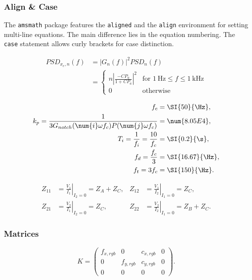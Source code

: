 \subsubsection{Align \& Case}

The \verb|amsmath| package features the \verb|aligned| and the \verb|align| environment for setting multi-line equations. The main difference
lies in the equation numbering. The \verb|case| statement allows curly brackets for case distinction.

\begin{equation}
	\begin{aligned}
		PSD_{x_{e}, n}(f) &= |G_n(f)|^2 PSD_{n}(f) \\
		&= \begin{cases}
			n|\frac{-CP_a}{1+CP_a}|^2 &\text{for } \SI{1}{\Hz} \leq f \leq \SI{1}{\kHz} \\
			0 & \text{otherwise } 
		\end{cases}
	\end{aligned}
	\label{psd_n}
\end{equation}

\begin{align}
	f_c &= \SI{50}{\Hz}, \\
	k_p = \frac{1}{3 G_{notch}(\num{i} \omega f_c) P(\num{j} \omega f_c)} &= \num{8.05E4}, \\
	T_i = \frac{1}{f_i} = \frac{10}{f_c} &= \SI{0.2}{\s}, \\
	f_d = \frac{f_c}{3} &= \SI{16.67}{\Hz}, \\
	f_t = 3 f_c &= \SI{150}{\Hz}.
\end{align}

\begin{align}
	Z_{11} &= \left.\frac{V_1}{I_1}\right\vert_{I_2=0} = Z_A+Z_C, &
	Z_{12} &= \left.\frac{V_1}{I_2}\right\vert_{I_1=0} = Z_C, \\
	Z_{21} &= \left.\frac{V_2}{I_1}\right\vert_{I_2=0} = Z_C, &
	Z_{22} &= \left.\frac{V_2}{I_2}\right\vert_{I_1=0} = Z_B+Z_C.
	\label{eq2}
\end{align}

\subsubsection{Matrices}

\begin{equation}
	K = \begin{pmatrix}
			f_{x, rgb} & 0 & c_{x, rgb} & 0\\ 
			0 & f_{y, rgb} & c_{y, rgb} & 0\\ 
			0 & 0 & 0 & 0
		\end{pmatrix}.
\end{equation}

